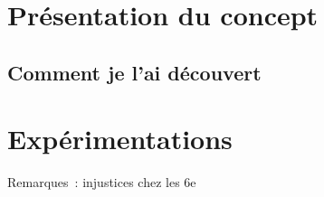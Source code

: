 \section{Présentation du concept}

\subsection{Comment je l'ai découvert}

\section{Expérimentations}

Remarques : injustices chez les 6e

